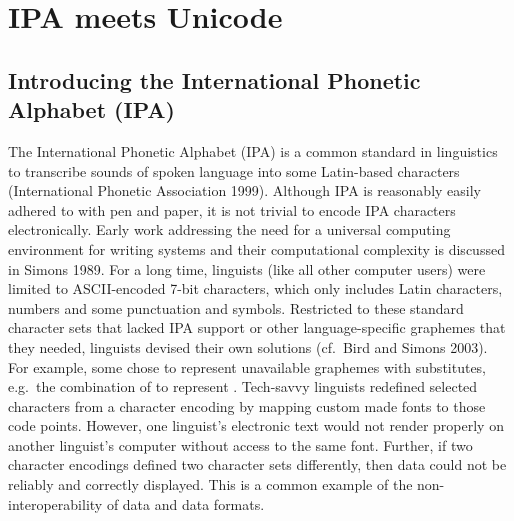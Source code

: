 \chapter{IPA meets Unicode}
\label{ipa-meets-unicode}

\section{Introducing the International Phonetic Alphabet (IPA)}
\label{introducing-the-international-phonetic-alphabet-ipa}

The International Phonetic Alphabet (IPA) is a common standard in linguistics to transcribe sounds of spoken language into some Latin-based characters (International Phonetic Association 1999). Although IPA is reasonably easily adhered to with pen and paper, it is not trivial to encode IPA characters electronically. Early work addressing the need for a universal computing environment for writing systems and their computational complexity is discussed in Simons 1989. For a long time, linguists (like all other computer users) were limited to ASCII-encoded 7-bit characters, which only includes Latin characters, numbers and some punctuation and symbols. Restricted to these standard character sets that lacked IPA support or other language-specific graphemes that they needed, linguists devised their own solutions (cf.~Bird and Simons 2003). For example, some chose to represent unavailable graphemes with substitutes, e.g.~the combination of to represent . Tech-savvy linguists redefined selected characters from a character encoding by mapping custom made fonts to those code points. However, one linguist's electronic text would not render properly on another linguist's computer without access to the same font. Further, if two character encodings defined two character sets differently, then data could not be reliably and correctly displayed. This is a common example of the non-interoperability of data and data formats.

